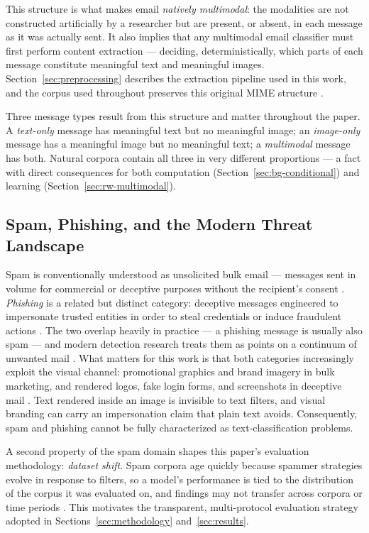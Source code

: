 \documentclass[10pt,twoside]{article}
\begin{document}
This structure is what makes email \emph{natively multimodal}: the modalities are not constructed artificially by a researcher but are present, or absent, in each message as it was actually sent. It also implies that any multimodal email classifier must first perform content extraction --- deciding, deterministically, which parts of each message constitute meaningful text and meaningful images. Section~\ref{sec:preprocessing} describes the extraction pipeline used in this work, and the corpus used throughout preserves this original MIME structure \citep{spamassassin2006}.

Three message types result from this structure and matter throughout the paper. A \emph{text-only} message has meaningful text but no meaningful image; an \emph{image-only} message has a meaningful image but no meaningful text; a \emph{multimodal} message has both. Natural corpora contain all three in very different proportions --- a fact with direct consequences for both computation (Section~\ref{sec:bg-conditional}) and learning (Section~\ref{sec:rw-multimodal}).

\subsection{Spam, Phishing, and the Modern Threat Landscape}\label{sec:bg-threat}

Spam is conventionally understood as unsolicited bulk email --- messages sent in volume for commercial or deceptive purposes without the recipient's consent \citep{janez2023review}. \emph{Phishing} is a related but distinct category: deceptive messages engineered to impersonate trusted entities in order to steal credentials or induce fraudulent actions \citep{kyaw2024phishing}. The two overlap heavily in practice --- a phishing message is usually also spam --- and modern detection research treats them as points on a continuum of unwanted mail \citep{kyaw2024phishing}. What matters for this work is that both categories increasingly exploit the visual channel: promotional graphics and brand imagery in bulk marketing, and rendered logos, fake login forms, and screenshots in deceptive mail \citep{annadatha2018image}. Text rendered inside an image is invisible to text filters, and visual branding can carry an impersonation claim that plain text avoids. Consequently, spam and phishing cannot be fully characterized as text-classification problems.

A second property of the spam domain shapes this paper's evaluation methodology: \emph{dataset shift}. Spam corpora age quickly because spammer strategies evolve in response to filters, so a model's performance is tied to the distribution of the corpus it was evaluated on, and findings may not transfer across corpora or time periods \citep{janez2023review}. This motivates the transparent, multi-protocol evaluation strategy adopted in Sections~\ref{sec:methodology} and~\ref{sec:results}.
\end{document}

